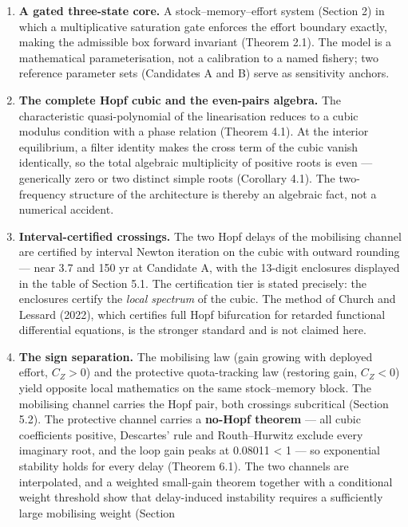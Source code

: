 \documentclass[11pt]{article}
\begin{document}
\begin{enumerate}
\def\labelenumi{\arabic{enumi}.}
\item
  \textbf{A gated three-state core.} A stock--memory--effort system
  (Section 2) in which a multiplicative saturation gate enforces the
  effort boundary exactly, making the admissible box forward invariant
  (Theorem 2.1). The model is a mathematical parameterisation, not a
  calibration to a named fishery; two reference parameter sets
  (Candidates A and B) serve as sensitivity anchors.
\item
  \textbf{The complete Hopf cubic and the even-pairs algebra.} The
  characteristic quasi-polynomial of the linearisation reduces to a
  cubic modulus condition with a phase relation (Theorem 4.1). At the
  interior equilibrium, a filter identity makes the cross term of the
  cubic vanish identically, so the total algebraic multiplicity of
  positive roots is even --- generically zero or two distinct simple
  roots (Corollary 4.1). The two-frequency structure of the architecture
  is thereby an algebraic fact, not a numerical accident.
\item
  \textbf{Interval-certified crossings.} The two Hopf delays of the
  mobilising channel are certified by interval Newton iteration on the
  cubic with outward rounding --- near 3.7 and 150 yr at Candidate A,
  with the 13-digit enclosures displayed in the table of Section 5.1.
  The certification tier is stated precisely: the enclosures certify the
  \emph{local spectrum} of the cubic. The method of Church and Lessard
  (2022), which certifies full Hopf bifurcation for retarded functional
  differential equations, is the stronger standard and is not claimed
  here.
\item
  \textbf{The sign separation.} The mobilising law (gain growing with
  deployed effort, \(C_Z > 0\)) and the protective quota-tracking law
  (restoring gain, \(C_Z < 0\)) yield opposite local mathematics on the
  same stock--memory block. The mobilising channel carries the Hopf
  pair, both crossings subcritical (Section 5.2). The protective channel
  carries a \textbf{no-Hopf theorem} --- all cubic coefficients
  positive, Descartes' rule and Routh--Hurwitz exclude every imaginary
  root, and the loop gain peaks at 0.08011 \textless{} 1 --- so
  exponential stability holds for every delay (Theorem 6.1). The two
  channels are interpolated, and a weighted small-gain theorem together
  with a conditional weight threshold show that delay-induced
  instability requires a sufficiently large mobilising weight (Section

\end{enumerate}
\end{document}
